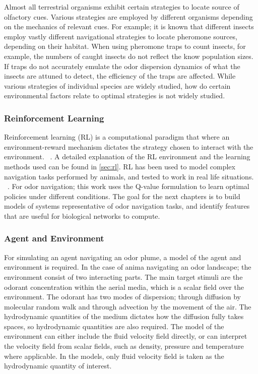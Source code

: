 \documentclass[../dissertation.tex]{subfiles}
\begin{document}
Almost all terrestrial organisms exhibit certain strategies to locate source of olfactory cues.
Various strategies are employed by different organisms depending on the mechanics of relevant cues.
For example; it is known that different insects employ vastly different navigational strategies to locate pheromone sources, depending on their habitat.
\cite{murlisOdorPlumesHow1992}
When using pheromone traps to count insects, for example, the numbers of caught insects do not reflect the know population sizes.
If traps do not accurately emulate the odor dispersion dynamics of what the insects are attuned to detect, the efficiency of the traps are affected.
While various strategies of individual species are widely studied, how do certain environmental factors relate to optimal strategies is not widely studied.

\subsubsection{Reinforcement Learning}

Reinforcement learning (RL) is a computational paradigm that where an environment-reward mechanism dictates the strategy chosen to interact with the environment.
~\cite{rlevidence}.
A detailed explanation of the RL environment and the learning methods used can be found in \cref{sec:rl}.
RL has been used to model complex navigation tasks performed by animals, and tested to work in real life situations.
~\cite{vergassola}.
For odor navigation; this work uses the Q-value formulation to learn optimal policies under different conditions.
The goal for the next chapters is to build models of systems representative of odor navigation tasks,
and identify features that are useful for biological networks to compute.

\subsubsection{Agent and Environment}

For simulating an agent navigating an odor plume, a model of the agent and environment is required.
In the case of anima navigating an odor landscape; the environment consist of two interacting parts.
The main target stimuli are the odorant concentration within the aerial media, which is a scalar field over the environment.
The odorant has two modes of dispersion; through diffusion by molecular random walk and through advection by the movement of the air.
The hydrodynamic quantities of the medium dictates how the diffusion fully takes spaces, so hydrodynamic quantities are also required.
The model of the environment can either include the fluid velocity field directly, or can interpret the velocity field from scalar fields, such as density, pressure and temperature where applicable.
In the models, only fluid velocity field is taken as the hydrodynamic quantity of interest.
\end{document}
